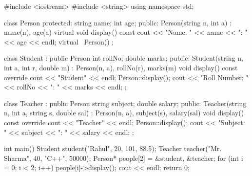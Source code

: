 \begin{code}
#include <iostream>
#include <string>
using namespace std;

class Person {
protected:
    string name; int age;
public:
    Person(string n, int a) : name(n), age(a) {}
    virtual void display() const {
        cout << "Name: " << name << "\nAge: " << age << endl;
    }
    virtual ~Person() {}
};

class Student : public Person {
    int rollNo; double marks;
public:
    Student(string n, int a, int r, double m) : Person(n, a), rollNo(r), marks(m) {}
    void display() const override {
        cout << "Student" << endl; Person::display();
        cout << "Roll Number: " << rollNo << "\nMarks: " << marks << endl;
    }
};

class Teacher : public Person {
    string subject; double salary;
public:
    Teacher(string n, int a, string s, double sal) : Person(n, a), subject(s), salary(sal) {}
    void display() const override {
        cout << "Teacher" << endl; Person::display();
        cout << "Subject: " << subject << "\nSalary: " << salary << endl;
    }
};

int main() {
    Student student("Rahul", 20, 101, 88.5);
    Teacher teacher("Mr. Sharma", 40, "C++", 50000);
    Person* people[2] = {&student, &teacher};
    for (int i = 0; i < 2; i++) { people[i]->display(); cout << endl; }
    return 0;
}
\end{code}

\outputlabel
{}


\codelabel

